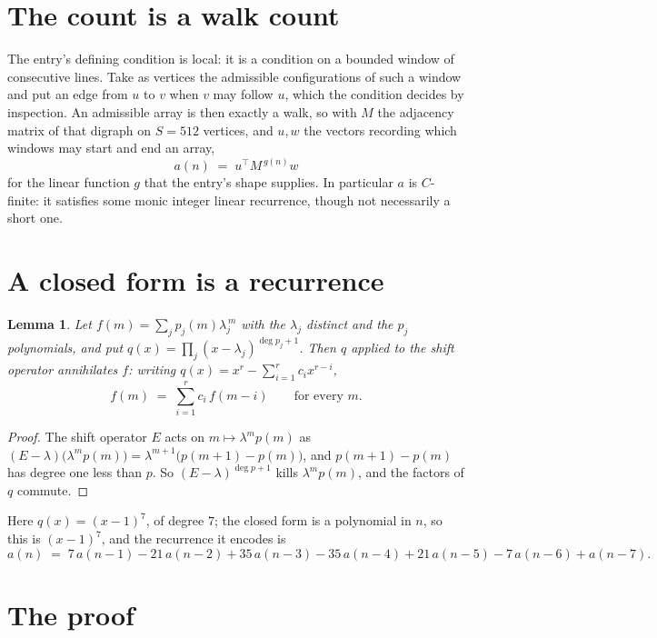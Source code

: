 \documentclass[11pt,a4paper]{article}
\theoremstyle{plain}
\newtheorem{lemma}[theorem]{Lemma}
\theoremstyle{definition}
\begin{document}
\section{The count is a walk count}

The entry's defining condition is local: it is a condition on a bounded window of consecutive lines. Take as vertices the
admissible configurations of such a window and put an edge from $u$ to $v$ when $v$ may
follow $u$, which the condition decides by inspection. An admissible array is then exactly a
walk, so with $M$ the adjacency matrix of that digraph on $S=512$ vertices, and $u,w$ the
vectors recording which windows may start and end an array,
\[
a(n)\;=\;u^{\!\top}M^{\,g(n)}w
\]
for the linear function $g$ that the entry's shape supplies. In particular $a$ is
$C$-finite: it satisfies some monic integer linear recurrence, though not necessarily a short
one.

\section{A closed form is a recurrence}

\begin{lemma}\label{lem:ann}
Let $f(m)=\sum_{j}p_j(m)\lambda_j^{\,m}$ with the $\lambda_j$ distinct and the $p_j$
polynomials, and put $q(x)=\prod_j(x-\lambda_j)^{\deg p_j+1}$. Then $q$ applied to the shift
operator annihilates $f$: writing $q(x)=x^{r}-\sum_{i=1}^{r}c_ix^{r-i}$,
\[
f(m)\;=\;\sum_{i=1}^{r}c_i\,f(m-i)\qquad\text{for every }m.
\]
\end{lemma}

\begin{proof}
The shift operator $E$ acts on $m\mapsto\lambda^{m}p(m)$ as
$(E-\lambda)\bigl(\lambda^{m}p(m)\bigr)=\lambda^{m+1}\bigl(p(m+1)-p(m)\bigr)$, and
$p(m+1)-p(m)$ has degree one less than $p$. So $(E-\lambda)^{\deg p+1}$ kills
$\lambda^{m}p(m)$, and the factors of $q$ commute.
\end{proof}

Here $q(x)=(x-1)^{7}$, of degree $7$; the closed form is a polynomial in $n$, so this is $(x-1)^{7}$, and the recurrence it encodes is
\begin{equation}\label{eq:rec}
a(n)\;=\;7\,a(n-1) - 21\,a(n-2) + 35\,a(n-3) - 35\,a(n-4) + 21\,a(n-5) - 7\,a(n-6) + a(n-7).
\end{equation}

\section{The proof}
\end{document}

